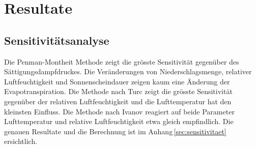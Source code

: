 \section{Resultate}




\subsection{Sensitivitätsanalyse}
Die Penman-Montheit Methode zeigt die grösste Sensitivität gegenüber des Sättigungsdampfdruckes. Die Veränderungen von Niederschlagsmenge, relativer Luftfeuchtigkeit und Sonnenscheindauer zeigen kaum eine Änderung der Evapotranspiration. Die Methode nach Turc zeigt die grösste Sensitivität gegenüber der relativen Luftfeuchtigkeit und die Lufttemperatur hat den kleinsten Einfluss. Die Methode nach Ivanov reagiert auf beide Parameter Lufttemperatur und relative Luftfeuchtigkeit etwa gleich empfindlich. Die genauen Resultate und die Berechnung ist im Anhang\,\ref{sec:sensitivitaet} ersichtlich.